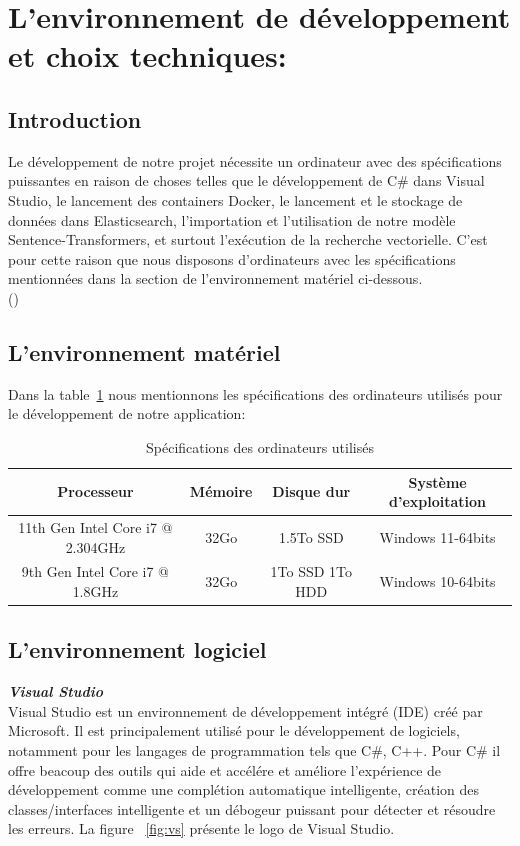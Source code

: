 \section{L'environnement de développement et choix techniques: }

\subsection{Introduction}
\noindent
Le développement de notre projet nécessite un ordinateur avec des spécifications puissantes en raison de choses telles que le développement de C\# dans Visual Studio, le lancement des containers Docker, le lancement et le stockage de données dans Elasticsearch, l'importation et l'utilisation de notre modèle Sentence-Transformers, et surtout l'exécution de la recherche vectorielle. C'est pour cette raison que nous disposons d'ordinateurs avec les spécifications mentionnées dans la section  de l'environnement matériel ci-dessous. \\
 (\cite{elastic:hardwarespecifications})

\subsection{L'environnement matériel}
\noindent
Dans la table~\ref{tab:compspec} nous mentionnons les spécifications des ordinateurs utilisés pour le développement de notre application: 

\begin{table}[H]
\centering
\begin{tabular}{|c|c|c|c|}
\hline
\rowcolor{blue!20}
\textbf{Processeur} & \textbf{Mémoire} & \textbf{Disque dur} & \textbf{Système d'exploitation} \\
\hline
11th Gen Intel Core i7 @ 2.304GHz & 32Go & 1.5To SSD & Windows 11-64bits \\
\hline
9th Gen Intel Core i7 @ 1.8GHz & 32Go & 1To SSD 1To HDD & Windows 10-64bits \\
\hline
\end{tabular}
\caption{Spécifications des ordinateurs utilisés}
\label{tab:compspec}
\end{table}

\newpage
\subsection{L'environnement logiciel}
\noindent
{\small\textbf{\textit{Visual Studio}}}\mbox{}\\
Visual Studio est un environnement de développement intégré (IDE) créé par Microsoft. Il est principalement utilisé pour le développement de logiciels, notamment pour les langages de programmation tels que C\#, C++. Pour C\# il offre beacoup des outils qui aide et accélére et améliore l'expérience de développement comme une complétion automatique intelligente, création des classes/interfaces intelligente et un débogeur puissant pour détecter et résoudre les erreurs. La figure ~\ref{fig:vs} présente le logo de Visual Studio.

